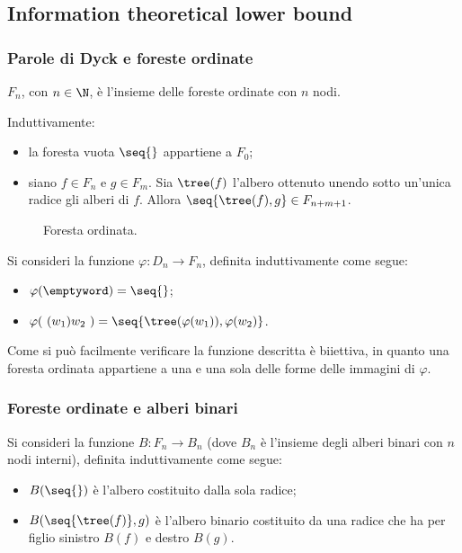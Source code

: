\subsection{Information theoretical lower bound}

\subsubsection{Parole di Dyck e foreste ordinate}
$F_n$, con $n\in\N$, è l'insieme delle foreste ordinate con $n$ nodi.
\begin{defin}
	Induttivamente:
	\begin{itemize}
		\item la foresta vuota $\seq{}$ appartiene a $F_0$;
		\item siano $f\in F_n$ e $g\in F_m$. Sia $\tree(f)$ l'albero ottenuto unendo sotto un'unica radice gli alberi di $f$. Allora $\seq{\tree(f),g}\in F_{n+m+1}$.
	\end{itemize}
\end{defin}

\begin{figure}[ht]
	\centering
	
	\caption{Foresta ordinata.}
	\label{fig:ordered_forest}
\end{figure}

Si consideri la funzione $\varphi:D_n\to F_n$, definita induttivamente come segue:
\begin{itemize}
	\item $\varphi(\emptyword)=\seq{}$;
	\item $\varphi(~(w_1)w_2~)=\seq{\tree(\varphi(w_1)),\varphi(w_2)}$.
\end{itemize}

Come si può facilmente verificare la funzione descritta è biiettiva, in quanto una foresta ordinata appartiene a una e una sola delle forme delle immagini di $\varphi$.


\subsubsection{Foreste ordinate e alberi binari}
Si consideri la funzione $B:F_n\to B_n$ (dove $B_n$ è l'insieme degli alberi binari con $n$ nodi interni), definita induttivamente come segue:
\begin{itemize}
	\item $B(\seq{})$ è l'albero costituito dalla sola radice;
	\item $B(\seq{\tree(f)},g)$ è l'albero binario costituito da una radice che ha per figlio sinistro $B(f)$ e destro $B(g)$.
\end{itemize}

